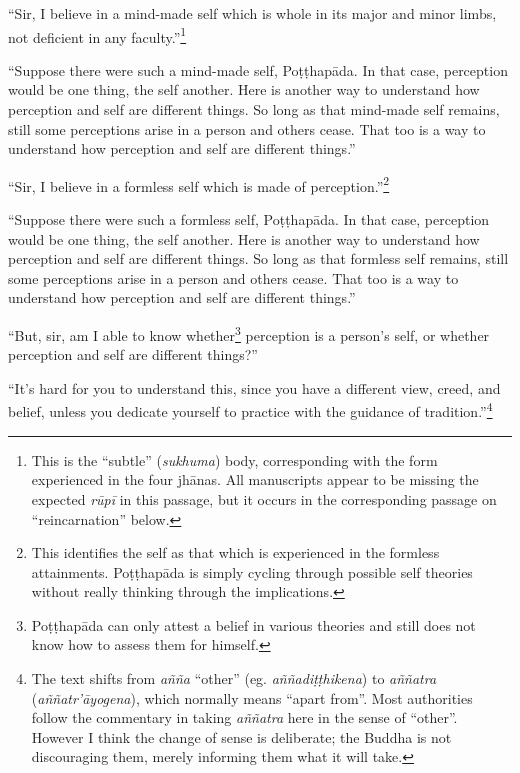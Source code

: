 \documentclass[12pt,openany]{book}%
\begin{document}
“Sir, I believe in a mind-made self which is whole in its major and minor limbs, not deficient in any faculty.”\footnote{This is the “subtle” (\textit{sukhuma}) body, corresponding with the form experienced in the four \textsanskrit{jhānas}. All manuscripts appear to be missing the expected \textit{\textsanskrit{rūpī}} in this passage, but it occurs in the corresponding passage on “reincarnation” below. } 

“Suppose there were such a mind-made self, \textsanskrit{Poṭṭhapāda}. In that case, perception would be one thing, the self another. Here is another way to understand how perception and self are different things. So long as that mind-made self remains, still some perceptions arise in a person and others cease. That too is a way to understand how perception and self are different things.” 

“Sir, I believe in a formless self which is made of perception.”\footnote{This identifies the self as that which is experienced in the formless attainments. \textsanskrit{Poṭṭhapāda} is simply cycling through possible self theories without really thinking through the implications. } 

“Suppose there were such a formless self, \textsanskrit{Poṭṭhapāda}. In that case, perception would be one thing, the self another. Here is another way to understand how perception and self are different things. So long as that formless self remains, still some perceptions arise in a person and others cease. That too is a way to understand how perception and self are different things.” 

“But, sir, am I able to know whether\footnote{\textsanskrit{Poṭṭhapāda} can only attest a belief in various theories and still does not know how to assess them for himself. } perception is a person’s self, or whether perception and self are different things?” 

“It’s hard for you to understand this, since you have a different view, creed, and belief, unless you dedicate yourself to practice with the guidance of tradition.”\footnote{The text shifts from \textit{\textsanskrit{añña}} “other” (eg. \textit{\textsanskrit{aññadiṭṭhikena}}) to \textit{\textsanskrit{aññatra}} (\textit{\textsanskrit{aññatr}’\textsanskrit{āyogena}}), which normally means “apart from”. Most authorities follow the commentary in taking \textit{\textsanskrit{aññatra}} here in the sense of “other”. However I think the change of sense is deliberate; the Buddha is not discouraging them, merely informing them what it will take. } 
\end{document}
